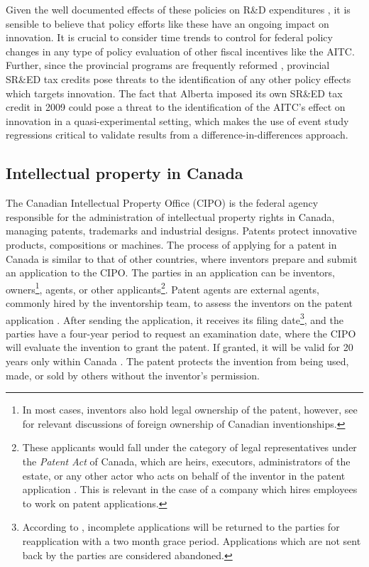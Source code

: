 \documentclass[../main.tex]{subfiles}
\begin{document}
Given the well documented effects of these policies on R\&D expenditures \parencite{mansfield_switzer85b, agrawal_etal20, becker15}, it is sensible to believe that policy efforts like these have an ongoing impact on innovation. It is crucial to consider time trends to control for federal policy changes in any type of policy evaluation of other fiscal incentives like the AITC. Further, since the provincial programs are frequently reformed \parencite{mckenzie05}, provincial SR\&ED tax credits pose threats to the identification of any other policy effects which targets innovation. The fact that Alberta imposed its own SR\&ED tax credit in 2009 could pose a threat to the identification of the AITC's effect on innovation in a quasi-experimental setting, which makes the use of event study regressions critical to validate results from a difference-in-differences approach.

\subsection{Intellectual property in Canada}

The Canadian Intellectual Property Office (CIPO) is the federal agency responsible for the administration of intellectual property rights in Canada, managing patents, trademarks and industrial designs. Patents protect innovative products, compositions or machines. The process of applying for a patent in Canada is similar to that of other countries, where inventors prepare and submit an application to the CIPO. The parties in an application can be inventors, owners\footnote{In most cases, inventors also hold legal ownership of the patent, however, see \textcite{alam_etal22, beaudry_schiffauerova11} for relevant discussions of foreign ownership of Canadian inventionships.}, agents, or other applicants\footnote{These applicants would fall under the category of legal representatives under the \textit{Patent Act} of Canada, which are heirs, executors, administrators of the estate, or any other actor who acts on behalf of the inventor in the patent application \parencite{Patent85}. This is relevant in the case of a company which hires employees to work on patent applications.}. Patent agents are external agents, commonly hired by the inventorship team, to assess the inventors on the patent application \parencite{putnam06}. After sending the application, it receives its filing date\footnote{According to \textcite{canadianintellectualpropertyoffice21}, incomplete applications will be returned to the parties for reapplication with a two month grace period. Applications which are not sent back by the parties are considered abandoned.}, and the parties have a four-year period to request an examination date, where the CIPO will evaluate the invention to grant the patent. If granted, it will be valid for 20 years only within Canada \parencite{abbes_etal22}. The patent protects the invention from being used, made, or sold by others without the inventor's permission. 
\end{document}
